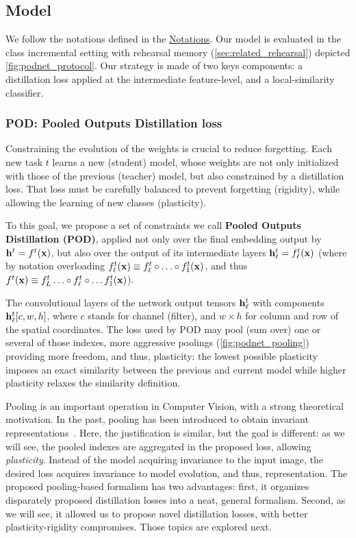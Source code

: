 \subsection{Model}
\label{sec:podnet_model}

We follow the notations defined in the \hyperref[chap:notations]{Notations}. Our model is evaluated
in the class incremental setting with rehearsal memory (\autoref{sec:related_rehearsal}) depicted
\autoref{fig:podnet_protocol}. Our strategy is made of two keys components: a distillation loss
applied at the intermediate feature-level, and a local-similarity classifier.

\subsubsection{POD: Pooled Outputs Distillation loss}
\label{sec:podnet_pod}

Constraining the evolution of the weights is crucial to reduce forgetting. Each new task $t$ learns
a new (student) model, whose weights are not only initialized with those of the previous (teacher)
model, but also constrained by a distillation loss. That loss must be carefully balanced to prevent
forgetting (rigidity), while allowing the learning of new classes (plasticity).

To this goal, we propose a set of constraints we call \textbf{Pooled Outputs Distillation (POD)},
applied not only over the final embedding output by $\mathbf{h}^{t}=f^{t}(\mathbf{x})$, but also over the output
of its intermediate layers $\mathbf{h}^{t}_\ell=f^{t}_\ell(\mathbf{x})$ (where by notation overloading
$f^{t}_\ell(\mathbf{x})\equiv f^{t}_\ell\circ\ldots\circ f^{t}_1(\mathbf{x})$, and thus $f^{t}(\mathbf{x})\equiv
    f^{t}_L\ldots\circ f^{t}_\ell\circ\ldots f^{t}_1(\mathbf{x})$).

The convolutional layers of the network output tensors $\mathbf{h}^{t}_{\ell}$ with components
$\mathbf{h}^{t}_\ell[c,w,h]$, where $c$ stands for channel (filter), and $w\times h$ for column and row of
the spatial coordinates. The loss used by POD may pool (sum over) one or several of those indexes,
more aggressive poolings (\autoref{fig:podnet_pooling}) providing more freedom, and thus,
plasticity: the lowest possible plasticity imposes an exact similarity between the previous and
current model while higher plasticity relaxes the similarity definition.

Pooling is an important operation in Computer Vision, with a strong theoretical motivation. In the
past, pooling has been introduced to obtain invariant
representations~\citep{lowe1999sift,lazbnik2006spatial_pyramid_matching}. Here, the justification is
similar, but the goal is different: as we will see, the pooled indexes are aggregated in the
proposed loss, allowing \textit{plasticity}. Instead of the model acquiring invariance to the input
image, the desired loss acquires invariance to model evolution, and thus, representation.
%
The proposed pooling-based formalism has two advantages: first, it organizes disparately proposed
distillation losses into a neat, general formalism. Second, as we will see, it allowed us to propose
novel distillation losses, with better plasticity-rigidity compromises. Those topics are explored
next.

